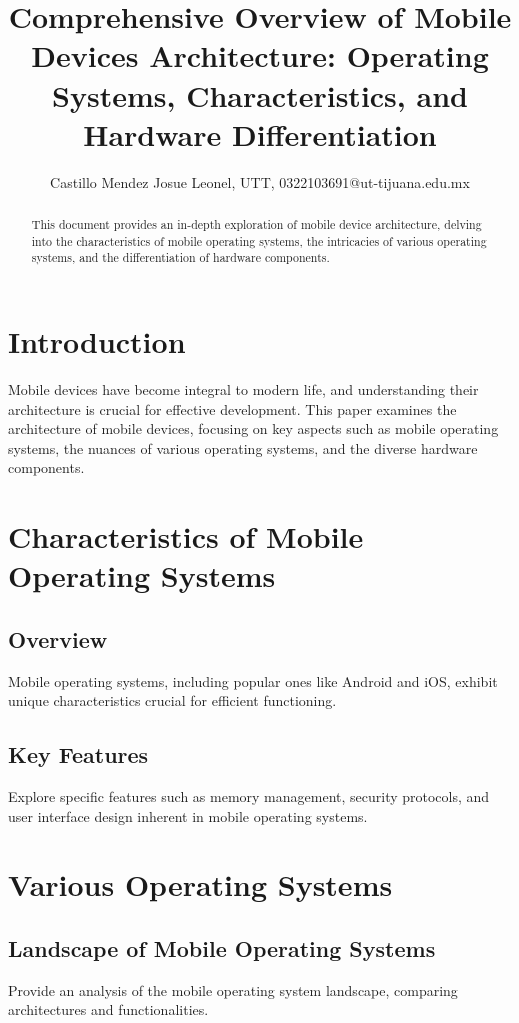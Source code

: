 \documentclass{article}
\title{Comprehensive Overview of Mobile Devices Architecture: Operating Systems, Characteristics, and Hardware Differentiation}
\author{Castillo Mendez Josue Leonel, UTT, 0322103691@ut-tijuana.edu.mx}
\date{}
\begin{document}
	
	\maketitle
	
	\begin{abstract}
		This document provides an in-depth exploration of mobile device architecture, delving into the characteristics of mobile operating systems, the intricacies of various operating systems, and the differentiation of hardware components.
	\end{abstract}
	
	\section{Introduction}
	Mobile devices have become integral to modern life, and understanding their architecture is crucial for effective development. This paper examines the architecture of mobile devices, focusing on key aspects such as mobile operating systems, the nuances of various operating systems, and the diverse hardware components.
	
	\section{Characteristics of Mobile Operating Systems}
	\subsection{Overview}
	Mobile operating systems, including popular ones like Android and iOS, exhibit unique characteristics crucial for efficient functioning.
	
	\subsection{Key Features}
	Explore specific features such as memory management, security protocols, and user interface design inherent in mobile operating systems.
	
	\section{Various Operating Systems}
	\subsection{Landscape of Mobile Operating Systems}
	Provide an analysis of the mobile operating system landscape, comparing architectures and functionalities.
	
\end{document}
